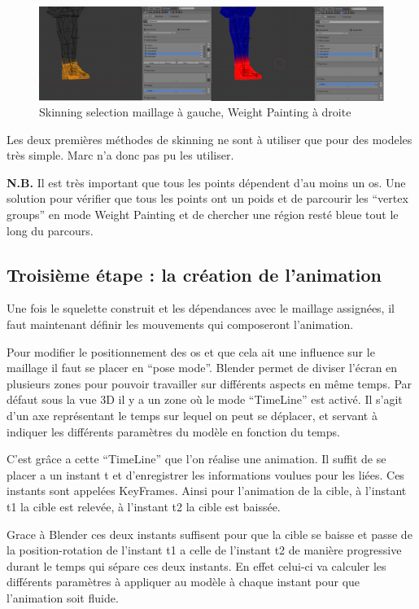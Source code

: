 \documentclass[11pt]{report}
\begin{document}
\begin{figure}[htbp]
\centering
\includegraphics[scale=0.8]{skinning.png}
\caption{Skinning selection maillage à gauche, Weight Painting à droite}
\end{figure}

Les deux premières méthodes de skinning ne sont à utiliser que pour des modeles très simple. Marc n’a donc pas pu les utiliser.

\noindent\textbf{N.B.} Il est très important que tous les points dépendent d’au moins un os. Une solution pour vérifier que tous les points ont un poids et de parcourir les ``vertex groups'' en mode Weight Painting et de chercher une région resté bleue tout le long du parcours.

\subsection{Troisième étape : la création de l’animation}

Une fois le squelette construit et les dépendances avec le maillage assignées, il faut maintenant définir les mouvements qui composeront l’animation.

Pour modifier le positionnement des os et que cela ait une influence sur le maillage il faut se placer en ``pose mode''.  Blender permet de diviser l’écran en plusieurs zones pour pouvoir travailler sur différents aspects en même temps. Par défaut sous la vue 3D il y a un zone où le mode ``TimeLine'' est activé. Il s’agit d’un axe représentant le temps sur lequel on peut se déplacer, et servant à indiquer les différents paramètres du modèle en fonction du temps.

C’est grâce a cette ``TimeLine'' que l’on réalise une animation. Il suffit de se placer a un instant t et d’enregistrer les informations voulues pour les liées. Ces instants sont appelées KeyFrames. Ainsi pour l’animation de la cible, à l’instant t1 la cible est relevée, à l’instant t2 la cible est baissée.

Grace à Blender ces deux instants suffisent pour que la cible se baisse et passe de la position-rotation de l’instant t1 a celle de l’instant t2 de manière progressive durant le temps qui sépare ces deux instants. En effet celui-ci va calculer les différents paramètres  à appliquer au modèle à chaque instant pour que l’animation soit fluide.
\end{document}
